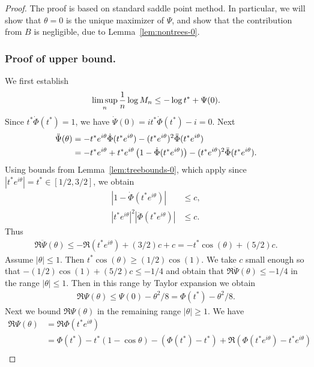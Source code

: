 \documentclass[12pt]{article}
\begin{document}
\begin{proof}
The proof is based on  standard saddle point method. In particular, we will show that $\theta=0$ is the unique maximizer of $\Psi$, and show that the contribution
from $B$ is negligible, due to Lemma~\ref{lem:nontrees-0}.


\subsubsection{Proof of upper bound.}
We first establish
\begin{align}
\limsup_n {1\over n}\log M_{n}\le -\log t^*+\Psi(0). \label{eq:limsup-M-n}
\end{align}
Since $t^* \dot\Phi(t^*) = 1$, we have $\dot\Psi(0) = it^*\dot\Phi(t^*) - i = 0$. Next
\begin{align}
\ddot \Psi(\theta)&=-t^*e^{i\theta}\dot \Phi(t^*e^{i\theta})-(t^*e^{i\theta})^2\ddot\Phi(t^*e^{i\theta}) \notag\\
&=-t^*e^{i\theta}+t^*e^{i\theta}\left(1-\dot \Phi(t^*e^{i\theta})\right)-(t^*e^{i\theta})^2\ddot\Phi(t^*e^{i\theta}). \label{ddot-Psi}
\end{align}
Using  bounds from Lemma~\ref{lem:treebounds-0}, which apply since $|t^*e^{i\theta}|=t^*\in [1/2,3/2]$, we obtain
\begin{align*}
 |1-\dot \Phi(t^*e^{i\theta})| &\le c, \\
|t^*e^{i\theta}|^2 |\ddot\Phi(t^*e^{i\theta})| &\le c.
\end{align*}
Thus
\begin{align*}
\Re\ddot\Psi(\theta)\le -\Re(t^*e^{i\theta})+(3/2)c+c =-t^*\cos(\theta)+(5/2)c.
\end{align*}
Assume $|\theta|\le 1$. Then $t^*\cos(\theta)\ge (1/2)\cos(1)$. We take  $c$ small enough so that $-(1/2)\cos(1)+(5/2)c\le -1/4$ and obtain
that $\Re \ddot\Psi(\theta)\le -1/4$ in the range $|\theta|\le 1$. Then in this range by Taylor expansion we obtain
\begin{align}\label{eq:theta-less-1}
\Re\Psi(\theta)\le \Psi(0)-\theta^2/8=\Phi(t^*)-\theta^2/8.
\end{align}
Next we bound $\Re\Psi(\theta)$ in the remaining range $|\theta|\ge 1$. We have
\begin{align*}
\Re \Psi(\theta) &= \Re \Phi(t^* e^{i\theta}) \\
&= \Phi(t^*) - t^*(1-\cos \theta) - \left(\Phi(t^*) - t^*\right) + \Re \left(\Phi(t^*e^{i\theta}) - t^* e^{i\theta}\right) \\
\end{align*}

\end{proof}
\end{document}
